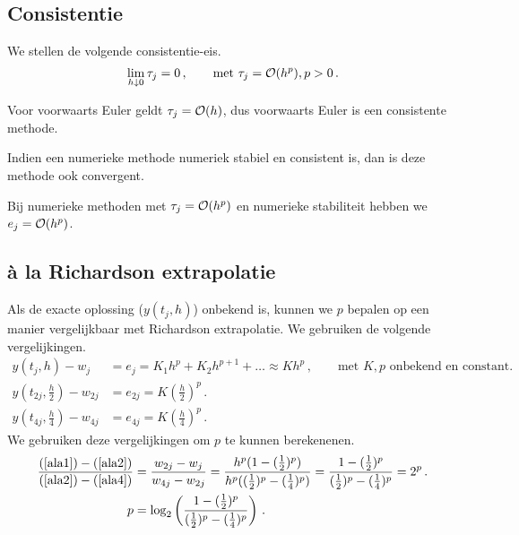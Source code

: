 \documentclass{2wn20summary}
\begin{document}
		\subsection{Consistentie}
			We stellen de volgende consistentie-eis.
			\[ 
				\lim_{h\downarrow 0} \tau_j = 0\,, \qquad \text{met }\tau_j = \mathcal{O}(h^p), p>0\,.
			\]
			\begin{voorbeeld}
				Voor voorwaarts Euler geldt $ \tau_j = \mathcal{O}(h) $, dus voorwaarts Euler is een consistente methode.
			\end{voorbeeld}
			
			\begin{theorem} 
				Indien een numerieke methode numeriek stabiel en consistent is, dan is deze methode ook convergent.
			\end{theorem}
			
			\begin{opm}
				Bij numerieke methoden met $ \tau_j = \mathcal{O}(h^p) $ en numerieke stabiliteit hebben we $ e_j = \mathcal{O}(h^p) $.
			\end{opm}
		
		\subsection{\`a la Richardson extrapolatie}
			Als de exacte oplossing ($ y(t_j,h) $) onbekend is, kunnen we $ p $ bepalen op een manier vergelijkbaar met Richardson extrapolatie. We gebruiken de volgende vergelijkingen.
			\begin{align}
				y(t_j,h) - w_j &= e_j = K_1 h^ p + K_2 h^ {p+1} + \dots \approx Kh^p\,, \qquad \text{met $K,p$ onbekend en constant.}\label{ala1} \\
				y(t_{2j}, \frac{h}{2}) - w_{2j} &= e_{2j} = K(\frac{h}{2})^p \,. \label{ala2} \\
				y(t_{4j}, \frac{h}{4}) - w_{4j} &= e_{4j} = K(\frac{h}{4})^p \,. \label{ala4} 
			\end{align}
			We gebruiken deze vergelijkingen om $p$ te kunnen berekenenen.
			\begin{align*}
				\frac{(\ref{ala1})-(\ref{ala2})}{(\ref{ala2})-(\ref{ala4})} &= \frac{w_{2j}-w_j}{w_{4j}-w_{2j}} = \frac{h^p (1-(\frac{1}{2})^p)}{h^p ((\frac{1}{2})^p- (\frac{1}{4})^p)} =\frac{1-(\frac{1}{2})^p}{(\frac{1}{2})^p- (\frac{1}{4})^p} = 2^p\,. \\
				p &= \log_2\left( \frac{1-(\frac{1}{2})^p}{(\frac{1}{2})^p- (\frac{1}{4})^p} \right)\,.
			\end{align*}
			
\end{document}

